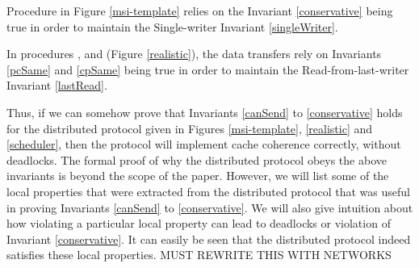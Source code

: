 Procedure \uReq{} in Figure \ref{msi-template} relies on the Invariant
\ref{conservative} being true in order to maintain the Single-writer Invariant
\ref{singleWriter}.

In procedures \uResp{}, \dResp{} and \dRespL{} (Figure \ref{realistic}), the
data transfers rely on Invariants \ref{pcSame} and \ref{cpSame} being true in
order to maintain the Read-from-last-writer Invariant \ref{lastRead}.

Thus, if we can somehow prove that Invariants \ref{canSend} to
\ref{conservative} holds for the distributed protocol given in Figures
\ref{msi-template}, \ref{realistic} and \ref{scheduler}, then the protocol will
implement cache coherence correctly, without deadlocks. The formal proof of why
the distributed protocol obeys the above invariants is beyond the scope of the
paper. However, we will list some of the local properties that were extracted
from the distributed protocol that was useful in proving Invariants
\ref{canSend} to \ref{conservative}. We will also give intuition about how
violating a particular local property can lead to deadlocks or violation of
Invariant \ref{conservative}. It can easily be seen that the distributed
protocol indeed satisfies these local properties. MUST REWRITE THIS WITH NETWORKS
